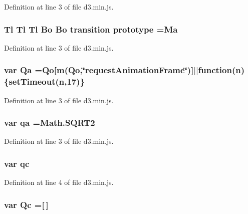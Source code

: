 Definition at line 3 of file d3.\+min.\+js.

\subsubsection[{prototype}]{ {\bf Tl} {\bf Tl} {\bf Tl} {\bf Bo} {\bf Bo} {\bf transition} prototype ={\bf Ma}}\label{d3_8min_8js_a7d25ff6857c2574908e6b32913e5c42a}


Definition at line 3 of file d3.\+min.\+js.

\subsubsection[{Qa}]{\setlength{\rightskip}{0pt plus 5cm}var Qa ={\bf Qo}[m({\bf Qo},\char`\"{}request\+Animation\+Frame\char`\"{})]$\vert$$\vert$function({\bf n})\{set\+Timeout({\bf n},17)\}}\label{d3_8min_8js_a31a242499f6c8c30ecddfef194063549}


Definition at line 3 of file d3.\+min.\+js.

\subsubsection[{qa}]{\setlength{\rightskip}{0pt plus 5cm}var qa =Math.\+S\+Q\+R\+T2}\label{d3_8min_8js_ad9f54dacb3b240946c0c6ba405e555d0}


Definition at line 3 of file d3.\+min.\+js.

\subsubsection[{qc}]{\setlength{\rightskip}{0pt plus 5cm}var qc}\label{d3_8min_8js_a54c5ddcd851b5aec904674bdf263a565}


Definition at line 4 of file d3.\+min.\+js.

\subsubsection[{Qc}]{\setlength{\rightskip}{0pt plus 5cm}var Qc =[$\,$]}\label{d3_8min_8js_affbfc997b9a7355404f3acc98e593d63}


